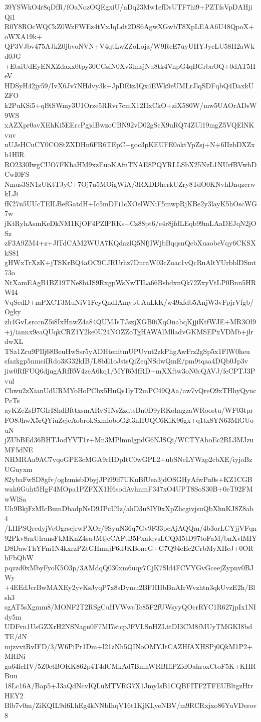 39YSWkO4r8qDfR/fOaNozOQEgxiU/nDq23Mw1efDsUTF7hi9+PZTfsVpDAHjiQi1
R0Y8ROcWQCkZ0WzFWEz4tVxJqLdt2DS6AgwXGwbT8XpLEAA6U48QpoX+oWXA19k+
QP3VJbv475AJkZ0jbvoNVN+V4qtLwZZoLoja/W9ReE7uyUHYJycLU58H2aWkd0JG
+EtaiUdEyENXZdaxx0tpy30CGsiN0Xv3lmsjNu8tk4VnpG4qBGrbaOQ+0dAT5HeV
HDSyH42jy59/IvX6Jv7NHdvy3k+JpDEtz3Qx4EWk9eUMLrJlqSDFqbQ4DaxkUZFO
k2PuKSi5+ql9iSWmy3U1Orze5RRvr7cmX12IIxCkO+ziX580W/mw5UAOrADsW9WS
xAZXpr0avXEhKi5EErcPgjdBwzoCBN92vD02gScX9uRQ74ZUl19mgZ5VQElNKvuv
nUJeHCuCY0COStZXDHn6FR6TEpC+goc3pKEUFE0oktYpZsj+N+6IIzbDXZxb1HlR
RO2330IwgCUO7FKhaHM9xzEuoKAfnTNAE8PQYRLLSbX25NzL1NUrfBVwbDCwI0FS
Nmus3SN1zUKtTJyC+7Oj7u5MOigWiA/3RXDDherkUZry8TdO0KNvhDnqzcrwkLJi
fK27n5UUcTEILBefGatdH+Ic5mDFi1cXOelWNiF5mwpRjKBe2y3layK5hOscWG7w
jKtRyhAsmKeDkNM1KjOF4PZlPRKs+Cz88pt6/e4r8jfdLEqb99mLAaDEJqN2jOSz
zF3A9ZM4+z+JlTdCAM2WUA7KQdazlQ5NfjIWjbBqqsnQcbXuaobeVqy6CKSXkS81
gHWxTrXzK+jTSKrBQ4aOC9CJRUrhz7DnraW03cZoac1vQcRuAltYUrbblDSmt73o
NtXamEAgB1BZ19TNe8biJS9RxgpWsNwTILa66BshdxnQk72ZxyVtLP0Bnn5HRWI4
VqScdD+mPXCT3MuNiV1FcyQndIAmypUAuLkK/w49xfdb5AnjW3vFpjrVfgb/Ogky
zh4GvLsrccnZ5i8IxHnwZ4a84QUMJsTJszjXGB0iXqOnabqKjjiKtfWJE+MR3Ol9
+j/iannx9eaQUqkCRZ1Y2ke0U24NOZZoTgHAWAlMlladvGKMSEPxVDMb+jlrdwXL
TSa1Zru9PIlj68BeuHwSsr5yADHtenitmUPUvut2zkPhgAwFrz2gSp5x1FlW0heu
sfazkgp5nmciIRdo3iG32kIB/L8bE1oJstsQiZeqNSdwQmE/pm9tqaa4DQb0Jp3v
jiw0RfFUQ6djugARfRW4zeA6kq1/MYf6MfRD+mXXftw3oN0cQAVJ/feCPTJ3Pvul
Chwu2zXianUdURMYoHoPCbx5HuQs1lyT2mPC49QAa/aw7vQreO9xTHhyQyncPcTs
ayKZeZsB7GIrI8hdBfttxsmARvS1NsZzdtsBn0D9yRKolmgzaWRoostu/WF03tpr
FO8JhwX5rQYiuZcjeAobrokSxmloboG2t3nHUQC6KiK96gx+q1tx8YN63MlGUouN
jZUbBEd36BHTJodYVT1r+Mn3MPlmnlgpdG6NJSQi/WCTYAboEc2RL3MJzuMF5dNE
NHMRAa9AC7vqoGPE3cMGA9rHDpItC0wGPL2+ubSNeLYWap2cbXE/iyjoBzUGuyxm
82ybaFwSD8gfv/oglzmisbDbyjJPi99lf7UKuBfUea3jdOSGHyAfwPn0s+KZ1CGB
wah6Guht5HgF4MOpa1PZFXX1H6sodAvhnmF347xO4UPT8SoS30B+0eT92FMwWlSa
Uh9BkjFzMIcBumDbadpNsD9JPcU9z/ahD3u8IY0xXpZhcgivjsuQbXhnKJ8Z8ab4
/LHPSQredyjVeOgrscjrwPXOr/9SyuN36q7Gv9F33peAjAQQm/4b3orLCYjjVFqn
92Pkv8rnUlransFkMKnZ4saJMtjeCAFtB5PxalqvsLCQM5tD97toFaM/bnXvlMIY
D8DawThYFm1N4kxrzPZtGHmnjF6dJKBoncG+G7Q94eEc2CrbMyXHcJ+0ORhFbQbW
pqzzd0xMbyFyoK5O3p/3AMdqQ030xm6uqy7CjK7Sld4FCVYGvGceejZypnv0BJWy
+4EEdJcrBwMAXEy2yvKsJyqP7x8sDymu2BFHHbBnAIrWvzhtn3qkUvzE2h/Blsh3
sgAT5sXgmm8/MONF2T2RSgCuHVWwcTc85F2fUWsyyQOcrRYC1R627jpIx1NIdy5m
UDFvn1UsGZXrH2NSNagn0F7MI7stcpJFVLSnHZLttDI3CM8fMUyTMGKI8bdTE/dN
mjzvvtRvIFD/3/W6PiPr1Dm+l21zNh5QINoOMYJtCAZHfAXHSPj0QkM1P2+MRlNi
ga64lcHV/5Z0ctBOKK862p4T4dCMkAd7BmhWRBIfiPZidOahroxCtoF5K+KHRBuu
18Lc16A/Bap5+J3aQdNcvIQLuMTVRG7X1JmyIsB1CQBFITF2TFEUBltgzHtrHEY2
Blb7v0m/ZiKQIL9d6LhEg4kNNbIhqV16t1KjKLyeNBV/m9RCRxjxo86YuVDerov8
